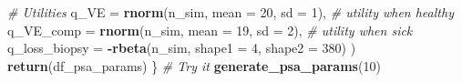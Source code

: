 \documentclass[]{article}
\newenvironment{Shaded}{\begin{snugshade}}{\end{snugshade}}
\newcommand{\KeywordTok}[1]{\textcolor[rgb]{0.13,0.29,0.53}{\textbf{#1}}}
\newcommand{\DataTypeTok}[1]{\textcolor[rgb]{0.13,0.29,0.53}{#1}}
\newcommand{\DecValTok}[1]{\textcolor[rgb]{0.00,0.00,0.81}{#1}}
\newcommand{\CommentTok}[1]{\textcolor[rgb]{0.56,0.35,0.01}{\textit{#1}}}
\newcommand{\OperatorTok}[1]{\textcolor[rgb]{0.81,0.36,0.00}{\textbf{#1}}}
\newcommand{\NormalTok}[1]{#1}
\begin{document}
\begin{Shaded}
\begin{Highlighting}[]
    \CommentTok{# Utilities}
    \DataTypeTok{q_VE          =} \KeywordTok{rnorm}\NormalTok{(n_sim, }\DataTypeTok{mean =} \DecValTok{20}\NormalTok{, }\DataTypeTok{sd =} \DecValTok{1}\NormalTok{), }\CommentTok{# utility when healthy}
    \DataTypeTok{q_VE_comp     =} \KeywordTok{rnorm}\NormalTok{(n_sim, }\DataTypeTok{mean =} \DecValTok{19}\NormalTok{, }\DataTypeTok{sd =} \DecValTok{2}\NormalTok{), }\CommentTok{# utility when sick}
    \DataTypeTok{q_loss_biopsy =} \OperatorTok{-}\KeywordTok{rbeta}\NormalTok{(n_sim, }\DataTypeTok{shape1 =} \DecValTok{4}\NormalTok{, }\DataTypeTok{shape2 =} \DecValTok{380}\NormalTok{)}
\NormalTok{  )}
  \KeywordTok{return}\NormalTok{(df_psa_params)}
\NormalTok{\}}
\CommentTok{# Try it}
\KeywordTok{generate_psa_params}\NormalTok{(}\DecValTok{10}\NormalTok{) }
\end{Highlighting}
\end{Shaded}
\end{document}
